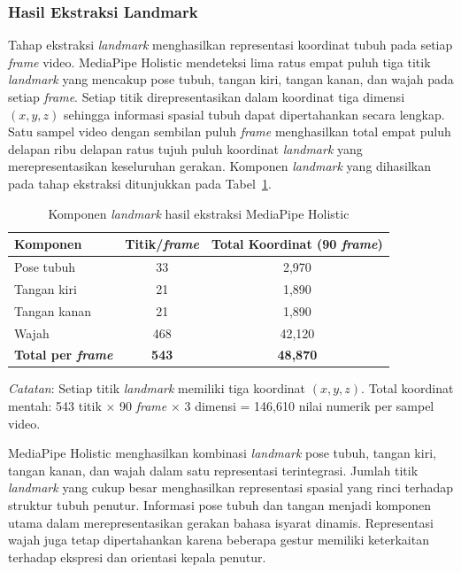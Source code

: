 \subsubsection{Hasil Ekstraksi Landmark}
\label{subsubsec:hasil-ekstraksi-landmark}

Tahap ekstraksi \textit{landmark} menghasilkan representasi koordinat tubuh pada setiap \textit{frame} video. 
MediaPipe Holistic mendeteksi lima ratus empat puluh tiga titik \textit{landmark} yang mencakup pose tubuh, tangan kiri, tangan kanan, dan wajah pada setiap \textit{frame}. 
Setiap titik direpresentasikan dalam koordinat tiga dimensi $(x,y,z)$ sehingga informasi spasial tubuh dapat dipertahankan secara lengkap. 
Satu sampel video dengan sembilan puluh \textit{frame} menghasilkan total empat puluh delapan ribu delapan ratus tujuh puluh koordinat \textit{landmark} yang merepresentasikan keseluruhan gerakan.
Komponen \textit{landmark} yang dihasilkan pada tahap ekstraksi ditunjukkan pada Tabel~\ref{tab:4-komponen-landmark}.

\begin{table}[H]
	\centering
	\caption{Komponen \textit{landmark} hasil ekstraksi MediaPipe Holistic}
	\label{tab:4-komponen-landmark}
	\begin{tabular}{|l|c|c|}
	\hline
	\textbf{Komponen} & \textbf{Titik/\textit{frame}} & \textbf{Total Koordinat (90 \textit{frame})} \\ \hline
	Pose tubuh & 33 & 2,970 \\ \hline
	Tangan kiri & 21 & 1,890 \\ \hline
	Tangan kanan & 21 & 1,890 \\ \hline
	Wajah & 468 & 42,120 \\ \hline
	\textbf{Total per \textit{frame}} & \textbf{543} & \textbf{48,870} \\ \hline
	\end{tabular}
	\vspace{0.5em}
	
	{\footnotesize \textit{Catatan}: Setiap titik \textit{landmark} memiliki tiga koordinat $(x,y,z)$. Total koordinat mentah: 543 titik $\times$ 90 \textit{frame} $\times$ 3 dimensi = 146,610 nilai numerik per sampel video.}
\end{table}

MediaPipe Holistic menghasilkan kombinasi \textit{landmark} pose tubuh, tangan kiri, tangan kanan, dan wajah dalam satu representasi terintegrasi. 
Jumlah titik \textit{landmark} yang cukup besar menghasilkan representasi spasial yang rinci terhadap struktur tubuh penutur. 
Informasi pose tubuh dan tangan menjadi komponen utama dalam merepresentasikan gerakan bahasa isyarat dinamis. 
Representasi wajah juga tetap dipertahankan karena beberapa gestur memiliki keterkaitan terhadap ekspresi dan orientasi kepala penutur.

